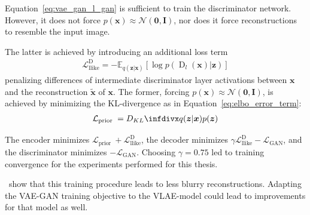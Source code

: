 Equation~\ref{eq:vae_gan_l_gan} is sufficient to train the discriminator network.
However, it does not force $p(\bm{x}) \approx \mathcal{N}(\bm{0},\bm{I})$, nor does it force reconstructions to resemble the input image.

The latter is achieved by introducing an additional loss term
\begin{align}
    \mathcal{L}_{\text {llike}}^{\text {D}}=-\mathbb{E}_{q(\bm{z} | \bm{x})}\left[\log p\left(\operatorname{D}_{l}(\bm{x}) | \bm{z}\right)\right]
\end{align}
penalizing differences of intermediate discriminator layer activations between $\bm{x}$ and the reconstruction $\tilde{\bm{x}}$ of $\bm{x}$.
The former, forcing $p(\bm{x}) \approx \mathcal{N}(\bm{0},\bm{I})$, is achieved by minimizing the \ac{KL}-divergence as in Equation~\ref{eq:elbo_error_term}:
\begin{align}
    \mathcal{L}_{\text {prior }}=\kldiv{q(\boldsymbol{z} | \boldsymbol{x})}{p(\boldsymbol{z})}
\end{align}

The encoder minimizes $\mathcal{L}_{\text {prior }} +  \mathcal{L}_{\text {llike}}^{\text {D}}$, the decoder minimizes $\gamma \mathcal{L}_{\text {llike}}^{\text {D}} - \mathcal{L}_\mathrm{GAN}$, and the discriminator minimizes $-\mathcal{L}_\mathrm{GAN}$.
Choosing $\gamma = 0.75$ led to training convergence for the experiments performed for this thesis.

\citet{larsen2015autoencoding}~show that this training procedure leads to less blurry reconstructions.
Adapting the \ac{VAE}-\ac{GAN} training objective to the \ac{VLAE}-model could lead to improvements for that model as well.

